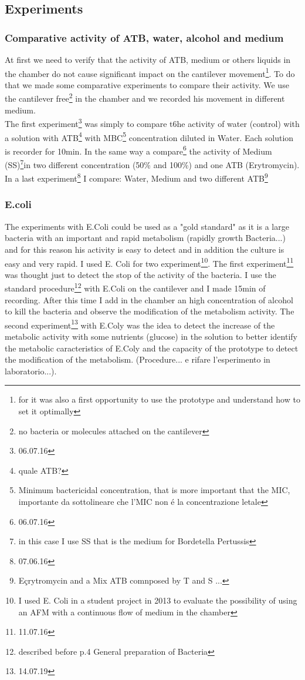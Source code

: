 \documentclass[11pt, a4paper]{article}
\begin{document}
\subsection{Experiments}%
\subsubsection{Comparative activity of ATB, water, alcohol and medium}
At first we need to verify that the activity of ATB, medium or others liquids in the chamber do not cause significant impact on the cantilever movement\footnote{for it was also a first opportunity to use the prototype and understand how to set it optimally}.
To do that we made some comparative experiments to compare their activity. We use the cantilever free\footnote{no bacteria or molecules attached on the cantilever} in the chamber and we recorded his movement in different medium. 
\\The first experiment\footnote{06.07.16} was simply to compare t6he activity of water (control) with a solution with ATB\footnote{quale ATB?} with MBC\footnote{Minimum bactericidal concentration, that is more important that the MIC, importante da sottolineare che l'MIC non é la concentrazione letale} concentration diluted in Water. Each solution is recorder for 10min. In the same way a compare\footnote{06.07.16} the activity of Medium (SS)\footnote{in this case I use SS that is the medium for Bordetella Pertussis}in two different concentration (50\% and 100\%) and one ATB (Erytromycin). In a last experiment\footnote{07.06.16} I compare: Water, Medium and two different ATB\footnote{Eçrytromycin and a Mix ATB comnposed by T and S ...}

\subsubsection{E.coli}
The experiments with E.Coli could be used as a "gold standard" as it is a large bacteria with an important and rapid metabolism (rapidly growth Bacteria...) and for this reason his activity is easy to detect  and in addition the culture is easy and very rapid. 
I used E. Coli for two experiment\footnote{I used E. Coli in a student project in 2013 to evaluate the possibility of using an AFM with a continuous flow of medium in the chamber}\cite{ilMioLavoroReport2013}. The first experiment\footnote{11.07.16} was thought just to detect the stop of the activity of the bacteria. I use the standard procedure\footnote{described before p.4 General preparation of Bacteria} with E.Coli on the cantilever and I made 15min of recording. After this time I add in the chamber an high concentration of alcohol to kill the bacteria and observe the modification of the metabolism activity. 
The second experiment\footnote{14.07.19} with E.Coly was the idea to detect the increase of the metabolic activity with some nutrients (glucose) in the solution to better identify the metabolic caracteristics of E.Coly and the capacity of the prototype to detect the modification of the metabolism. (Procedure... e rifare l'esperimento in laboratorio...). 
\end{document}
